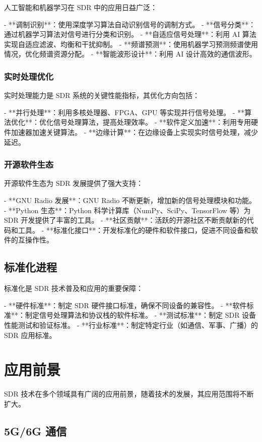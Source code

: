 \documentclass[UTF8]{ctexbook}
\begin{document}
人工智能和机器学习在 SDR 中的应用日益广泛：

- **调制识别**：使用深度学习算法自动识别信号的调制方式。
- **信号分类**：通过机器学习算法对信号进行分类和识别。
- **自适应信号处理**：利用 AI 算法实现自适应滤波、均衡和干扰抑制。
- **频谱预测**：使用机器学习预测频谱使用情况，优化频谱资源分配。
- **智能波形设计**：利用 AI 设计高效的通信波形。

\subsubsection{实时处理优化}

实时处理能力是 SDR 系统的关键性能指标，其优化方向包括：

- **并行处理**：利用多核处理器、FPGA、GPU 等实现并行信号处理。
- **算法优化**：优化信号处理算法，提高处理效率。
- **软件定义加速**：利用专用硬件加速器加速关键算法。
- **边缘计算**：在边缘设备上实现实时信号处理，减少延迟。

\subsubsection{开源软件生态}

开源软件生态为 SDR 发展提供了强大支持：

- **GNU Radio 发展**：GNU Radio 不断更新，增加新的信号处理模块和功能。
- **Python 生态**：Python 科学计算库（NumPy、SciPy、TensorFlow 等）为 SDR 开发提供了丰富的工具。
- **社区贡献**：活跃的开源社区不断贡献新的代码和工具。
- **标准化接口**：开发标准化的硬件和软件接口，促进不同设备和软件的互操作性。

\subsection{标准化进程}

标准化是 SDR 技术普及和应用的重要保障：

- **硬件标准**：制定 SDR 硬件接口标准，确保不同设备的兼容性。
- **软件标准**：制定信号处理算法和协议栈的软件标准。
- **测试标准**：制定 SDR 设备性能测试和验证标准。
- **行业标准**：制定特定行业（如通信、军事、广播）的 SDR 应用标准。

\section{应用前景}

SDR 技术在多个领域具有广阔的应用前景，随着技术的发展，其应用范围将不断扩大。

\subsection{5G/6G 通信}
\end{document}
